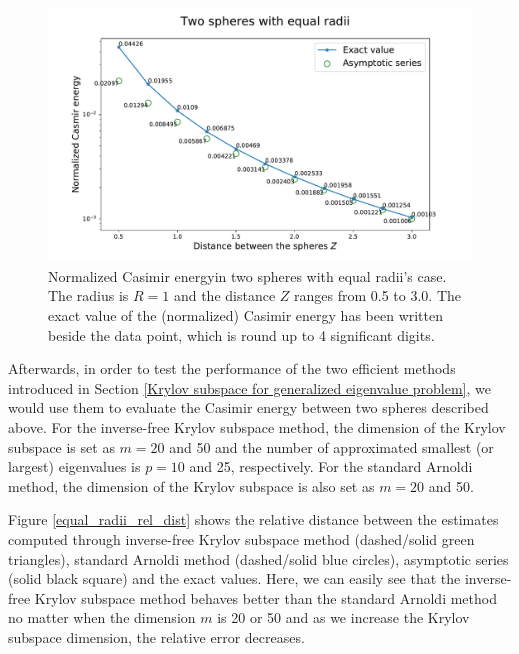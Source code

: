 \begin{figure}[H]
    \includegraphics[scale = 0.7]{figures/Spheres_equal_CasE.pdf}
    \caption[Caption for LOF]{Normalized Casimir energy\protect\footnotemark in two spheres with equal radii's case. The radius is $R = 1$ and the distance $Z$ 
    ranges from 0.5 to 3.0. The exact value of the (normalized) Casimir energy has been written beside the data point, which is round up to 4 significant digits.}
    \label{Casimir energy between spheres with equal radii}
\end{figure}

Afterwards, in order to test the performance of the two efficient methods introduced in Section \ref{Krylov subspace for generalized eigenvalue problem}, we
would use them to evaluate the Casimir energy between two spheres described above. For the inverse-free Krylov subspace method, the dimension of the Krylov subspace is set as $m = 20$ and 50 and the 
number of approximated smallest (or largest) eigenvalues is $p = 10$ and 25, respectively. For the standard Arnoldi method, the dimension of the 
Krylov subspace is also set as $m = 20$ and 50. 

Figure \ref{equal_radii_rel_dist} shows the relative distance between the estimates computed through inverse-free Krylov subspace method 
(dashed/solid green triangles), standard Arnoldi method (dashed/solid blue circles), asymptotic series (solid black square) and the exact values.
Here, we can easily see that the inverse-free Krylov subspace method behaves better than the standard Arnoldi method no matter when the dimension $m$ is 
20 or 50 and as we increase the Krylov subspace dimension, the relative error decreases.

